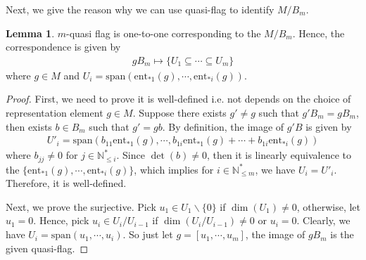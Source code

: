 \documentclass[10pt,UTF8]{article}
\theoremstyle{definition}
\newtheorem{lemma}[definition]{Lemma}
\newtheorem*{proof}{Proof}
\begin{document}
Next, we give the reason why we can use quasi-flag to identify $M/B_m$.
\begin{lemma}
  $m$-quasi flag is one-to-one corresponding to the $M/B_m$. Hence, the correspondence is given by
  \begin{align*}
    gB_m \mapsto \{U_1\subseteq \cdots \subseteq U_m\}
  \end{align*}
  where $g\in M$ and $U_i =\text{span}\left(\text{ent}_{*1}(g),\cdots,\text{ent}_{*i}(g)\right)$.
\end{lemma}
\begin{proof}
  First, we need to prove it is well-defined i.e. not depends on the choice of representation element $g\in M$.
  Suppose there exists $g'\neq g$ such that $g'B_m=gB_m$, then exists $b\in B_m$ such that $g' = gb$. 
  By definition, the image of $g'B$ is given by
  \begin{align*}
    U'_i = \text{span}\left(b_{11}\text{ent}_{*1}(g),\cdots,b_{1i}\text{ent}_{*1}(g)+\cdots+ b_{1i}\text{ent}_{*i}(g)\right)
  \end{align*}
  where $b_{jj}\neq 0$ for $j\in \mathbb{N}^*_{\le i}$. Since $\det(b)\neq 0$, then
  it is linearly equivalence to the $\{\text{ent}_{*1}(g),\cdots,\text{ent}_{*i}(g)\}$, which implies for $i\in \mathbb{N}^*_{\le m}$, we have 
  $U_{i}=U'_i$. Therefore, it is well-defined.

  Next, we prove the surjective. Pick $u_1\in U_1\backslash \{0\}$ if $\dim(U_1)\neq 0$, otherwise, let $u_1=0$.
  Hence, pick $u_i\in U_{i}/U_{i-1}$ if $\dim(U_{i}/U_{i-1})\neq 0$ or $u_i=0$. Clearly, we have $U_i=\text{span}(u_1,\cdots,u_i)$. So just let 
  $g = [u_1,\cdots,u_m]$, the image of $gB_m$ is the given quasi-flag.


\end{proof}
\end{document}
